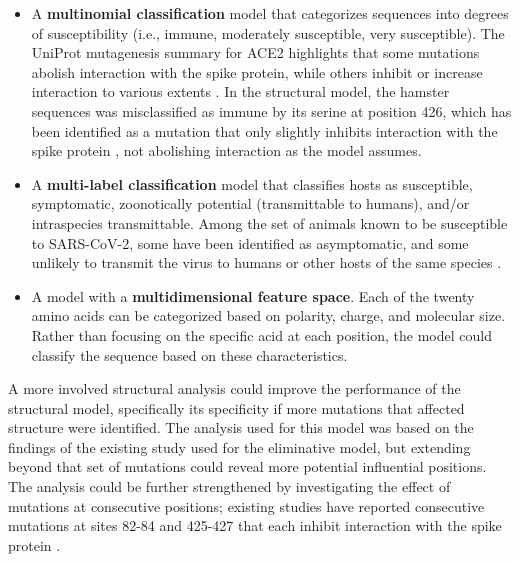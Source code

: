 \begin{itemize}
    \item A \textbf{multinomial classification} model that categorizes sequences into degrees of susceptibility (i.e., immune, moderately susceptible, very susceptible). The UniProt mutagenesis summary for ACE2 highlights that some mutations abolish interaction with the spike protein, while others inhibit or increase interaction to various extents \cite{UniProt}. In the structural model, the hamster sequences was misclassified as immune by its serine at position 426, which has been identified as a mutation that only slightly inhibits interaction with the spike protein \cite{UniProt,Li2005}, not abolishing interaction as the model assumes. 
    \item A \textbf{multi-label classification} model that classifies hosts as susceptible, symptomatic, zoonotically potential (transmittable to humans), and/or intraspecies transmittable. Among the set of animals known to be susceptible to SARS-CoV-2, some have been identified as asymptomatic, and some unlikely to transmit the virus to humans or other hosts of the same species \cite{OIE2022,Singh2021}.
    \item A model with a \textbf{multidimensional feature space}. Each of the twenty amino acids can be categorized based on polarity, charge, and molecular size. Rather than focusing on the specific acid at each position, the model could classify the sequence based on these characteristics.
\end{itemize}
A more involved structural analysis could improve the performance of the structural model, specifically its specificity if more mutations that affected structure were identified. The analysis used for this model was based on the findings of the existing study used for the eliminative model, but extending beyond that set of mutations could reveal more potential influential positions. The analysis could be further strengthened by investigating the effect of mutations at consecutive positions; existing studies have reported consecutive mutations at sites 82-84 and 425-427 that each inhibit interaction with the spike protein \cite{Li2005,Li2021,UniProt}.
